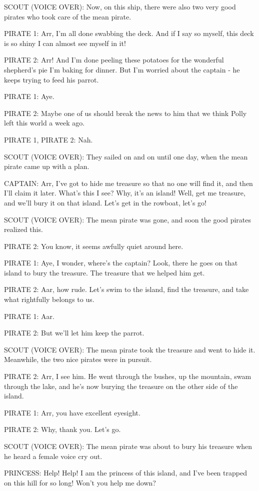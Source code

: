 SCOUT (VOICE OVER):
Now, on this ship, there were also two very good pirates who took care of the mean pirate.

PIRATE 1:
Arr, I'm all done swabbing the deck.
And if I say so myself, this deck is so shiny I can almost see myself in it!

PIRATE 2:
Arr!
And I'm done peeling these potatoes for the wonderful shepherd's pie I'm baking for dinner.
But I'm worried about the captain - he keeps trying to feed his parrot.

PIRATE 1:
Aye.

PIRATE 2:
Maybe one of us should break the news to him that we think Polly left this world a week ago.

PIRATE 1, PIRATE 2:
Nah.

SCOUT (VOICE OVER):
They sailed on and on until one day, when the mean pirate came up with a plan.

CAPTAIN:
Arr, I've got to hide me treasure so that no one will find it, and then I'll claim it later.
What's this I see?
Why, it's an island!
Well, get me treasure, and we'll bury it on that island.
Let's get in the rowboat, let's go!

SCOUT (VOICE OVER):
The mean pirate was gone, and soon the good pirates realized this.

PIRATE 2:
You know, it seems awfully quiet around here.

PIRATE 1:
Aye, I wonder, where's the captain?
Look, there he goes on that island to bury the treasure.
The treasure that we helped him get.

PIRATE 2:
Aar, how rude.
Let's swim to the island, find the treasure, and take what rightfully belongs to us.

PIRATE 1:
Aar.

PIRATE 2:
But we'll let him keep the parrot.

SCOUT (VOICE OVER):
The mean pirate took the treasure and went to hide it.
Meanwhile, the two nice pirates were in pursuit.

PIRATE 2:
Arr, I see him.
He went through the bushes, up the mountain, swam through the lake, and he's now burying the treasure on the other side of the island.

PIRATE 1:
Arr, you have excellent eyesight.

PIRATE 2:
Why, thank you.
Let's go.

SCOUT (VOICE OVER):
The mean pirate was about to bury his treasure when he heard a female voice cry out.

PRINCESS:
Help!
Help!
I am the princess of this island, and I've been trapped on this hill for so long!
Won't you help me down?

